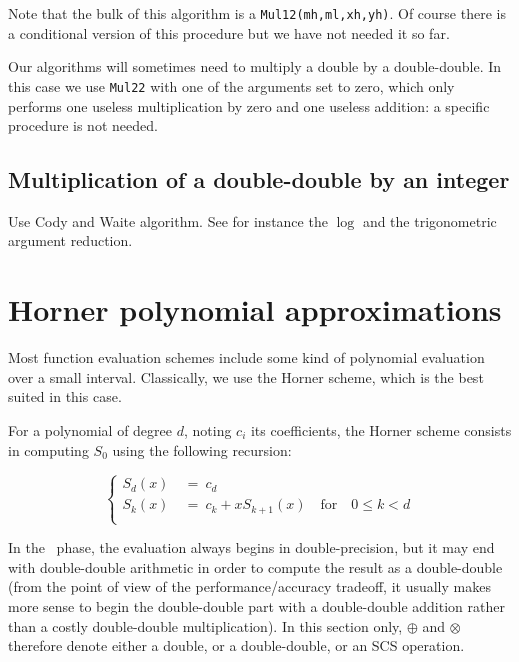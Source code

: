 Note that the bulk of this algorithm is a \texttt{Mul12(mh,ml,xh,yh)}.
Of course there is a conditional version of this procedure but we have not needed it so far.

Our algorithms will sometimes need to multiply a double by a
double-double. In this case we use \texttt{Mul22} with one of the
arguments set to zero, which only performs one useless multiplication
by zero and one useless addition: a specific procedure is not needed.




\subsection{Multiplication of a double-double by an integer}


Use Cody and Waite algorithm. See for instance  the $\log$ and the trigonometric
argument reduction.












\section{Horner polynomial approximations \label{sec:Horner}}

Most function evaluation schemes include some kind of polynomial
evaluation over a small interval. Classically, we use the Horner
scheme, which is the best suited in this case. 

For a polynomial of degree $d$, noting $c_i$ its coefficients, the
Horner scheme consists in computing $S_0$ using the following
recursion:

  $$ \left\{
    \begin{array}{rl}
      S_d(x)  &\ = \ c_d\\
      S_k(x)  &\  =\ c_k+xS_{k+1}(x) \quad \mathrm{for}\quad 0\le k <d\\
    \end{array}
  \right.
  $$


  
  In the \quick\ phase, the evaluation always begins in
  double-precision, but it may end with double-double arithmetic in
  order to compute the result as a double-double (from the point of
  view of the performance/accuracy tradeoff, it usually makes more
  sense to begin the double-double part with a double-double addition
  rather than a costly double-double multiplication).  In this section
  only, $\oplus$ and $\otimes$ therefore denote either a double, or a
  double-double, or an SCS operation.


